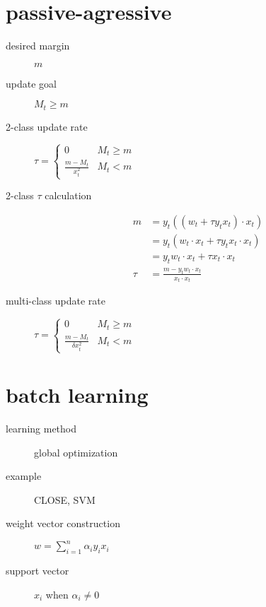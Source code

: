\documentclass[12pt]{article}
\begin{document}
\begin{multicols}{2}
  \section{passive-agressive}
  \begin{description}
    \item[desired margin] $m$
    \item[update goal] $M_t \geq m$
    \item[2-class update rate]
      $\tau =
      \begin{cases}
        0 & M_t \geq m \\
        \frac{m - M_t}{x_{t}^2} & M_t < m
      \end{cases}$
    \item[2-class $\tau$ calculation]
      \begin{align*}
        m
        &= y_{t} ((w_{t} + \tau y_{t} x_{t}) \cdot x_{t})\\
        &= y_{t} (w_{t} \cdot x_{t} + \tau y_{t} x_{t} \cdot x_{t})\\
        &= y_{t} w_{t} \cdot x_{t} + \tau x_{t} \cdot x_{t} \\
        \tau
        &= \frac{m - y_{t} w_{t} \cdot x_{t}}{ x_{t} \cdot x_{t}}
      \end{align*}
    \item[multi-class update rate]
      $\tau =
      \begin{cases}
        0 & M_t \geq m \\
        \frac{m - M_t}{\delta x_t^2} & M_t < m
      \end{cases}$
  \end{description}

  \section{batch learning}
  \begin{description}
  \item[learning method] global optimization
  \item[example] CLOSE, SVM
  \item[weight vector construction] $w = \sum_{i=1}^n \alpha_i y_i x_i$
  \item[support vector] $x_i$ when $ \alpha_i \neq 0$
  \end{description}


\end{multicols}
\end{document}
